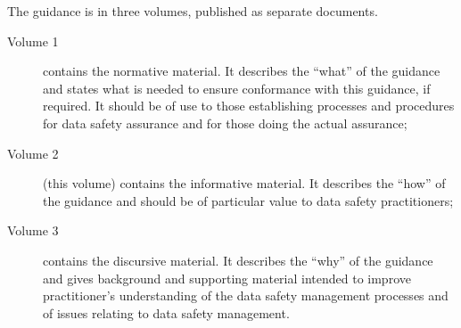 The guidance is in three volumes, published as separate documents.
\begin{description}
	\item[Volume 1] contains the normative material. It describes the ``what'' of the guidance and states what is needed to ensure conformance with this guidance, if required. It should be of use to those establishing processes and procedures for data safety assurance and for those doing the actual assurance;
	\item[Volume 2] (this volume) contains the informative material. It describes the ``how'' of the guidance and should be of particular value to data safety practitioners;
	\item[Volume 3] contains the discursive material. It describes the ``why'' of the guidance and gives background and supporting material intended to improve practitioner's understanding of the data safety management processes and of issues relating to data safety management.
\end{description}
	
